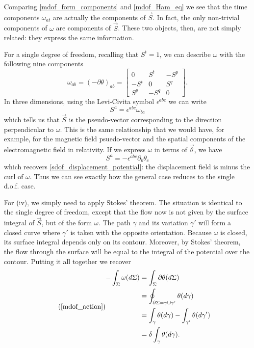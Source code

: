 \documentclass[10pt,twocolumn, nofootinbib]{revtex4-2}
\begin{document}
Comparing \ref{mdof_form_components} and \ref{mdof_Ham_eq} we see that the time components $\omega_{at}$ are actually the components of $\vec{S}$. In fact, the only non-trivial components of $\omega$ are components of $\vec{S}$. These two objects, then, are not simply related: they express the same information.

For a single degree of freedom, recalling that $S^t = 1$, we can describe $\omega$ with the following nine components
\begin{equation}\label{mdof_reduceto_sdof}
	\omega_{ab}=(-\partial\theta)_{ab} = \begin{bmatrix}
		0 & S^t & -S^p \\
		-S^t & 0 & S^q \\
		S^p & - S^q & 0
	\end{bmatrix}.
\end{equation}
In three dimensions, using the Levi-Civita symbol $\epsilon^{abc}$ we can write
\begin{equation}
	S^a = \epsilon^{abc} \omega_{bc}
\end{equation}
which tells us that $\vec{S}$ is the pseudo-vector corresponding to the direction perpendicular to $\omega$. This is the same relationship that we would have, for example, for the magnetic field psuedo-vector and the spatial components of the electromagnetic field in relativity. If we express $\omega$ in terms of $\vec{\theta}$, we have
\begin{equation}
	S^a = - \epsilon^{abc} \partial_b \theta_c
\end{equation}
which recovers \ref{sdof_displacement_potential}: the displacement field is minus the curl of $\omega$. Thus we can see exactly how the general case reduces to the single d.o.f. case.

For (iv), we simply need to apply Stokes' theorem. The situation is identical to the single degree of freedom, except that the flow now is not given by the surface integral of $\vec{S}$, but of the form $\omega$. The path $\gamma$ and its variation $\gamma'$ will form a closed curve where $\gamma'$ is taken with the opposite orientation. Because $\omega$ is closed, its surface integral depends only on its contour. Moreover, by Stokes' theorem, the flow through the surface will be equal to the integral of the potential over the contour. Putting it all together we recover
\begin{equation}
\tag*{(\ref{mdof_action})}
\begin{aligned}
	- \int_{\Sigma} \omega(d\Sigma) &=
	\int_{\Sigma} \partial \theta (d\Sigma) \\
	&= \oint_{\partial \Sigma = \gamma \cup \gamma'} \theta(d\gamma) \\
	&= \int_{\gamma} \theta(d\gamma) - \int_{\gamma'} \theta (d\gamma') \\
	&= \delta \int_{\gamma} \theta (d\gamma).
\end{aligned}
\end{equation}
\end{document}
